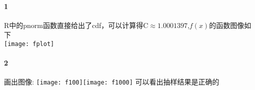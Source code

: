 \documentclass[11pt,a4paper]{ctexart}
\title{\vspace{-5ex}}
\author{基科32 曾柯又 2013012266}
\date{\vspace{-5ex}}
\begin{document}
	\graphicspath{{C:/Users/cengqQ/Pictures/}}
\abovedisplayskip=5pt
\belowdisplayskip=5pt
\abovedisplayshortskip=0pt
\belowdisplayshortskip=0pt
\maketitle
\paragraph{1}
R中的pnorm函数直接给出了cdf，可以计算得\(\mathrm{C}\approx 1.0001397\),\(f(x)\)的函数图像如下\\
{\centering \texttt{[image: fplot]}}
\paragraph{2}
画出图像:
{\center \texttt{[image: f100]}\texttt{[image: f1000]}}
可以看出抽样结果是正确的
\end{document}
